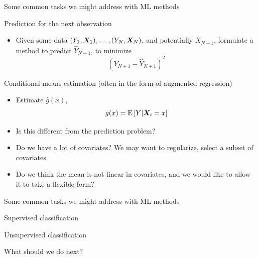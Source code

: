 \documentclass[xcolor={dvipsnames},handout]{beamer}
\begin{document}
\begin{frame}{Some common tasks we might address with ML methods}
\pause
\begin{wideitemize}
\item Prediction for the next observation \pause
\begin{itemize}
\item Given some data $(Y_1, \bm{X}_1), \dots, (Y_N, \bm{X}_N)$, and potentially $X_{N+1}$, formulate a method to predict $\hat{Y}_{N+1}$, to minimize
\[
\left(Y_{N+1} - \hat{Y}_{N+1}\right)^2
\]
\end{itemize}
\pause
\item Conditional means estimation \pause (often in the form of augmented regression)\pause
\begin{itemize}
\item Estimate $\hat g(x)$, 
\[
g(x) = {\textrm E}\,[Y | \bm{X}_i = x]
\]\pause
\item Is this different from the prediction problem? \pause
\item Do we have a lot of covariates? We may want to regularize, select a subset of covariates. \pause
\item Do we think the mean is not linear in covariates, and we would like to allow it to take a flexible form? 
\end{itemize}
\end{wideitemize}

\end{frame}



\begin{frame}{Some common tasks we might address with ML methods}
\pause
\begin{wideitemize}
\item Supervised classification \pause
\item Unsupervised classification \pause
\item What should we do next?
\end{wideitemize}

\end{frame}
\end{document}
